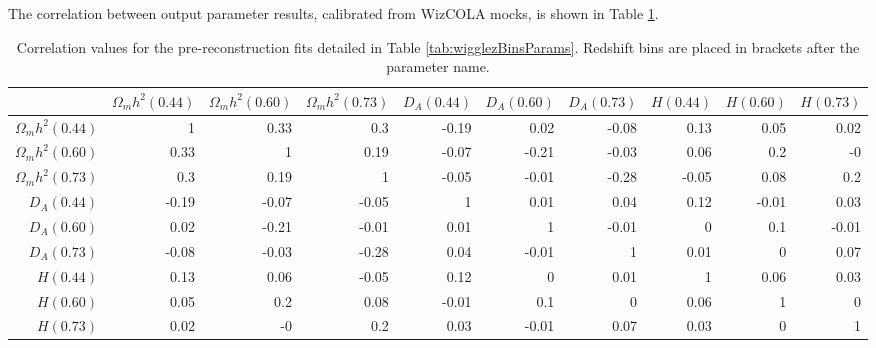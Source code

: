 \documentclass[a4paper,fleqn,usenatbib]{mnras}
\begin{document}
The correlation between output parameter results, calibrated from WizCOLA mocks, is shown in Table \ref{tab:cor}.
\begin{table}
	\centering
	\caption{Correlation values for the pre-reconstruction fits detailed in Table \ref{tab:wigglezBinsParams}. Redshift bins are placed in brackets after the parameter name.}
	\label{tab:cor}
	\begin{tabular}{rrrrrrrrrr}
		\hline
		~ & $\Omega_m h^2(0.44)$ &  $\Omega_m h^2(0.60)$ &   $\Omega_m h^2(0.73)$ &   $D_A(0.44)$ &   $D_A(0.60)$ &   $D_A(0.73)$ &    $H(0.44)$ &   $H(0.60)$ &   $H(0.73)$ \\
		\hline
	    $\Omega_m h^2(0.44)$ &      1    &        0.33 &        0.3  &       -0.19 &        0.02 &       -0.08 &        0.13 &        0.05 &        0.02 \\
	    $\Omega_m h^2(0.60)$ &      0.33 &        1    &        0.19 &       -0.07 &       -0.21 &       -0.03 &        0.06 &        0.2  &       -0    \\
	    $\Omega_m h^2(0.73)$ &      0.3  &        0.19 &        1    &       -0.05 &       -0.01 &       -0.28 &       -0.05 &        0.08 &        0.2  \\
	    $D_A(0.44)$          &     -0.19 &       -0.07 &       -0.05 &        1    &        0.01 &        0.04 &        0.12 &       -0.01 &        0.03 \\
	    $D_A(0.60)$          &      0.02 &       -0.21 &       -0.01 &        0.01 &        1    &       -0.01 &        0    &        0.1  &       -0.01 \\
	    $D_A(0.73)$          &     -0.08 &       -0.03 &       -0.28 &        0.04 &       -0.01 &        1    &        0.01 &        0    &        0.07 \\
        $H(0.44)$            &      0.13 &        0.06 &       -0.05 &        0.12 &        0    &        0.01 &        1    &        0.06 &        0.03 \\
	    $H(0.60)$            &      0.05 &        0.2  &        0.08 &       -0.01 &        0.1  &        0    &        0.06 &        1    &        0    \\
	    $H(0.73)$            &      0.02 &       -0    &        0.2  &        0.03 &       -0.01 &        0.07 &        0.03 &        0    &        1    \\
		\hline
	\end{tabular}
\end{table}

\bsp	%
\label{lastpage}
\end{document}

